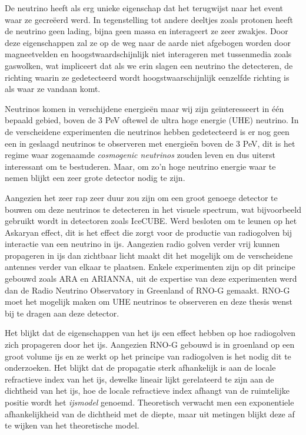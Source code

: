 \documentclass[11pt,a4paper,faculty=we,language=en,doctype=report]{cls/ugent-doc}
\begin{document}
De neutrino heeft als erg unieke eigenschap dat het terugwijst naar het event
waar ze gecreëerd werd. In tegenstelling tot andere deeltjes zoals protonen
heeft de neutrino geen lading, bijna geen massa en interageert ze zeer zwakjes.
Door deze eigenschappen zal ze op de weg naar de aarde niet afgebogen worden 
door magneetvelden en hoogstwaardschijnlijk niet interageren met tussenmedia zoals
gaswolken, wat impliceert dat als we erin slagen een neutrino the detecteren, de 
richting waarin ze gedetecteerd wordt hoogstwaarschijnlijk eenzelfde richting is als
waar ze vandaan komt.

Neutrinos komen in verschijdene energieën maar wij zijn geïnteresseert in één bepaald gebied,
boven de 3 PeV oftewel de ultra hoge energie (UHE) neutrino. In de verscheidene experimenten die 
neutrinos hebben gedetecteerd is er nog geen een in geslaagd neutrinos te observeren met 
energieën boven de 3 PeV, dit is het regime waar zogenaamde \textit{cosmogenic neutrinos} zouden
leven en dus uiterst interessant om te bestuderen. Maar, om zo'n hoge neutrino energie waar te nemen
blijkt een zeer grote detector nodig te zijn.

Aangezien het zeer rap zeer duur zou zijn om een groot genoege detector te bouwen om deze neutrinos 
te detecteren in het visuele spectrum, wat bijvoorbeeld gebruikt wordt in detectoren zoals IceCUBE.
Werd besloten om te leunen op het Askaryan effect, dit is het effect die zorgt voor de productie
van radiogolven bij interactie van een neutrino in ijs. Aangezien radio golven verder vrij kunnen
propageren in ijs dan zichtbaar licht maakt dit het mogelijk om de verscheidene antennes verder
van elkaar te plaatsen. Enkele experimenten zijn op dit principe gebouwd zoals ARA en ARIANNA,
uit de expertise van deze experimenten werd dan de Radio Neutrino Observatory in Greenland of RNO-G gemaakt.
RNO-G moet het mogelijk maken om UHE neutrinos te observeren en deze thesis wenst bij te dragen aan deze 
detector.

Het blijkt dat de eigenschappen van het ijs een effect hebben op hoe radiogolven zich propageren door het ijs.
Aangezien RNO-G gebouwd is in groenland op een groot volume ijs en ze werkt op het principe van radiogolven
is het nodig dit te onderzoeken. Het blijkt dat de propagatie sterk afhankelijk is aan de locale refractieve
index van het ijs, dewelke lineair lijkt gerelateerd te zijn aan de dichtheid van het ijs, hoe de locale
refractieve index afhangt van de ruimtelijke positie wordt het \textit{ijsmodel} genoemd. Theoretisch
verwacht men een exponentiele afhankelijkheid van de dichtheid met de diepte, maar uit metingen blijkt deze
af te wijken van het theoretische model. 
\end{document}
